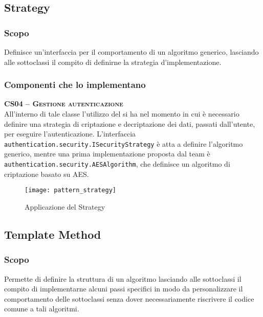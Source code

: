 \subsection{Strategy}\label{sec:patternstrategy}

\subsubsection{Scopo}
Definisce un'interfaccia per il comportamento di un algoritmo generico, lasciando alle sottoclassi il compito di definirne la strategia d'implementazione.

\subsubsection{Componenti che lo implementano}
\begin{description}

  \item{\scshape\bfseries CS04 -- Gestione autenticazione}\\
All'interno di tale classe l'utilizzo del  si ha nel momento in cui è necessario definire una strategia di criptazione e decriptazione dei dati, passati dall'utente, per eseguire l'autenticazione. L'interfaccia \texttt{authentication.security.ISecurityStrategy} è atta a definire l'algoritmo generico, mentre una prima implementazione proposta dal team è \texttt{authentication.security.AESAlgorithm}, che definisce un algoritmo di criptazione basato su AES.

\begin{figure}[H]
  \centering
  \texttt{[image: pattern\_strategy]}
  \caption{Applicazione del  Strategy}\label{fig:strategy}
\end{figure}

\end{description}

\subsection{Template Method}
\subsubsection{Scopo}
Permette di definire la struttura di un algoritmo lasciando alle sottoclassi il compito di implementarne alcuni passi specifici in modo da personalizzare il comportamento delle sottoclassi senza dover necessariamente riscrivere il codice comune a tali algoritmi.

